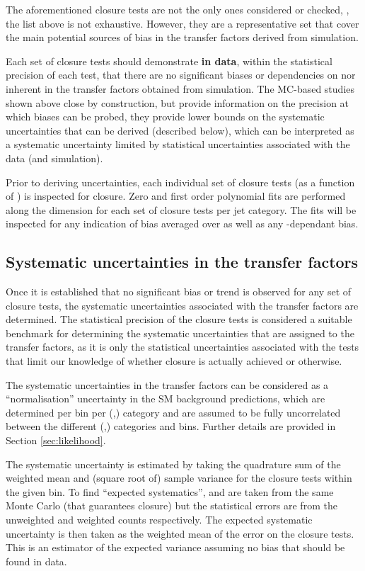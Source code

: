 The aforementioned closure tests are not the only ones considered or
checked, \ie, the list above is not exhaustive. However, they are a
representative set that cover the main potential sources of bias in
the transfer factors derived from simulation. 

Each set of closure tests should demonstrate {\bf in data}, within the
statistical precision of each test, that there are no significant
biases or dependencies on \njet nor \scalht inherent in the transfer
factors obtained from simulation. The MC-based studies shown above
close by construction, but provide information on the precision at
which biases can be probed, \ie they provide lower bounds on the
systematic uncertainties that can be derived (described below), which
can be interpreted as a systematic uncertainty limited by statistical
uncertainties associated with the data (and simulation).

Prior to deriving uncertainties, each individual set of closure tests
(as a function of \scalht) is inspected for closure. Zero and first order
polynomial fits are performed along the \scalht dimension for each set
of closure tests per jet category. The fits will be inspected for any
indication of bias averaged over \scalht as well as any
\scalht-dependant bias.

\subsection{Systematic uncertainties in the transfer factors\label{sec:syst-from-closure}}

Once it is established that no significant bias or trend is observed
for any set of closure tests, the systematic uncertainties associated
with the transfer factors are determined. The statistical precision of
the closure tests is considered a suitable benchmark for determining
the systematic uncertainties that are assigned to the transfer
factors, as it is only the statistical uncertainties associated with
the tests that limit our knowledge of whether closure is actually
achieved or otherwise.

The systematic uncertainties in the transfer factors can be considered
as a ``normalisation'' uncertainty in the SM background predictions,
which are determined per \scalht bin per (\njet,\nb) category and are
assumed to be fully uncorrelated between the different (\njet,\nb)
categories and \scalht bins. Further details are provided in Section
\ref{sec:likelihood}. 

The systematic uncertainty is estimated by taking the quadrature sum
of the weighted mean and (square root of) sample variance for the
closure tests within the given \scalht bin. To find ``expected
systematics'', \nobs and \npre are taken from the same Monte Carlo
(that guarantees closure) but the statistical errors are from the
unweighted and weighted counts respectively. The expected systematic
uncertainty is then taken as the weighted mean of the error on the
closure tests. This is an estimator of the expected variance assuming
no bias that should be found in data. 

